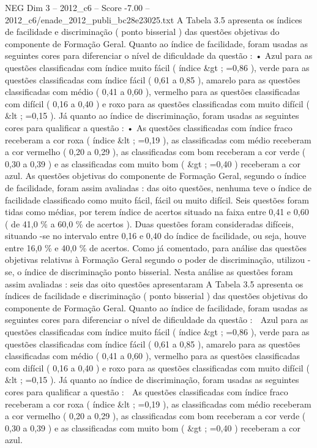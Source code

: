 \begin{textsample}{NEG Dim 3 – 2012\_c6 – Score -7.00 – 2012\_c6/enade\_2012\_publi\_bc28e23025.txt}
A Tabela 3.5 apresenta os índices de facilidade e discriminação ( ponto bisserial ) das questões objetivas do componente de Formação Geral.
Quanto ao índice de facilidade, foram usadas as seguintes cores para diferenciar o nível de dificuldade da questão : • Azul para as questões classificadas com índice muito fácil ( índice \&gt ; =0,86 ), verde para as questões classificadas com índice fácil ( 0,61 a 0,85 ), amarelo para as questões classificadas com médio ( 0,41 a 0,60 ), vermelho para as questões classificadas com difícil ( 0,16 a 0,40 ) e roxo para as questões classificadas com muito difícil ( \&lt ; =0,15 ).
Já quanto ao índice de discriminação, foram usadas as seguintes cores para qualificar a questão : • As questões classificadas com índice fraco receberam a cor roxa ( índice \&lt ; =0,19 ), as classificadas com médio receberam a cor vermelho ( 0,20 a 0,29 ), as classificadas com bom receberam a cor verde ( 0,30 a 0,39 ) e as classificadas com muito bom ( \&gt ; =0,40 ) receberam a cor azul.
As questões objetivas do componente de Formação Geral, segundo o índice de facilidade, foram assim avaliadas : das oito questões, nenhuma teve o índice de facilidade classificado como muito fácil, fácil ou muito difícil.
Seis questões foram tidas como médias, por terem índice de acertos situado na faixa entre 0,41 e 0,60 ( de 41,0 \% a 60,0 \% de acertos ).
Duas questões foram consideradas difíceis, situando -se no intervalo entre 0,16 e 0,40 do índice de facilidade, ou seja, houve entre 16,0 \% e 40,0 \% de acertos.
Como já comentado, para análise das questões objetivas relativas à Formação Geral segundo o poder de discriminação, utilizou -se, o índice de discriminação ponto bisserial.
Nesta análise as questões foram assim avaliadas : seis das oito questões apresentaram A Tabela 3.5 apresenta os índices de facilidade e discriminação ( ponto bisserial ) das questões objetivas do componente de Formação Geral.
Quanto ao índice de facilidade, foram usadas as seguintes cores para diferenciar o nível de dificuldade da questão :  Azul para as questões classificadas com índice muito fácil ( índice \&gt ; =0,86 ), verde para as questões classificadas com índice fácil ( 0,61 a 0,85 ), amarelo para as questões classificadas com médio ( 0,41 a 0,60 ), vermelho para as questões classificadas com difícil ( 0,16 a 0,40 ) e roxo para as questões classificadas com muito difícil ( \&lt ; =0,15 ).
Já quanto ao índice de discriminação, foram usadas as seguintes cores para qualificar a questão :  As questões classificadas com índice fraco receberam a cor roxa ( índice \&lt ; =0,19 ), as classificadas com médio receberam a cor vermelho ( 0,20 a 0,29 ), as classificadas com bom receberam a cor verde ( 0,30 a 0,39 ) e as classificadas com muito bom ( \&gt ; =0,40 ) receberam a cor azul.

\end{textsample}
